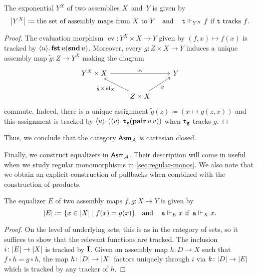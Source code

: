 \begin{proposition}[Exponentials]
  The exponential \(Y^X\) of two assemblies \(X\)~and~\(Y\) is given by
  \[
    \carrier*{Y^X} \coloneq
    \text{the set of assembly maps from \(X\) to \(Y\)}
    \quad\text{and}\quad
    \pca{t} \realizes_{Y^X} f
    \text{ if \(\pca{t}\) tracks \(f\)}.
  \]
\end{proposition}
\begin{proof}
  The evaluation morphism \(\operatorname{ev} \colon Y^X \times X \to Y\) given
  by \((f,x) \mapsto f(x)\) is tracked by
  \(\lambdapca{u}{\pcafst u(\pcasnd u)}\).
  Moreover, every \(g \colon Z \times X \to Y\) induces a unique assembly map
  \(\tilde g \colon Z \to Y^X\) making the diagram
  \[
    \begin{tikzcd}
      Y^X \times X \ar[rr,"\operatorname{ev}"]
      & & Y \\
      & Z \times X \ar[ur,"g"']
      \ar[ul,"{\tilde g} \,\times\, {\id_X}"]
    \end{tikzcd}
  \]
  commute.
  Indeed, there is a unique assignment
  \(\tilde g(z) \coloneq (x \mapsto g(z,x))\) and this assignment is tracked by
  \(\lambdapca{u}{(\lambdapca{v}{\pca{t_g}(\pcapair u\,v)})}\) when
  \(\pca{t_g}\) tracks \(g\).
\end{proof}

Thus, we conclude that the category \(\Asm{\AA}\) is cartesian closed.

Finally, we construct equalizers in \(\Asm{\AA}\). Their description will come
in useful when we study regular monomorphisms in \cref{sec:regular-monos}. We
also note that we obtain an explicit construction of pullbacks when combined
with the construction of products.

\begin{proposition}[Equalizers]
  The equalizer \(E\) of two assembly maps \(f,g \colon X \to Y\) is given by
  \[
    \carrier{E} \coloneq \set{x \in \carrier{X} \mid f(x) = g(x)}
    \quad\text{and}\quad
    \pca{a} \realizes_E x \text{ if } \pca{a} \realizes_X x.
  \]
\end{proposition}
\begin{proof}
  On the level of underlying sets, this is as in the category of sets, so it
  suffices to show that the relevant functions are tracked.
  The inclusion \(i \colon \carrier{E} \to \carrier{X}\) is tracked by
  \(\icomb\).
  Given an assembly map \(h \colon D \to X\) such that
  \(f \circ h = g \circ h\), the map \(h \colon \carrier{D} \to \carrier{X}\)
  factors uniquely through \(i\) via \(k \colon \carrier{D} \to \carrier{E}\)
  which is tracked by any tracker of \(h\).
\end{proof}


